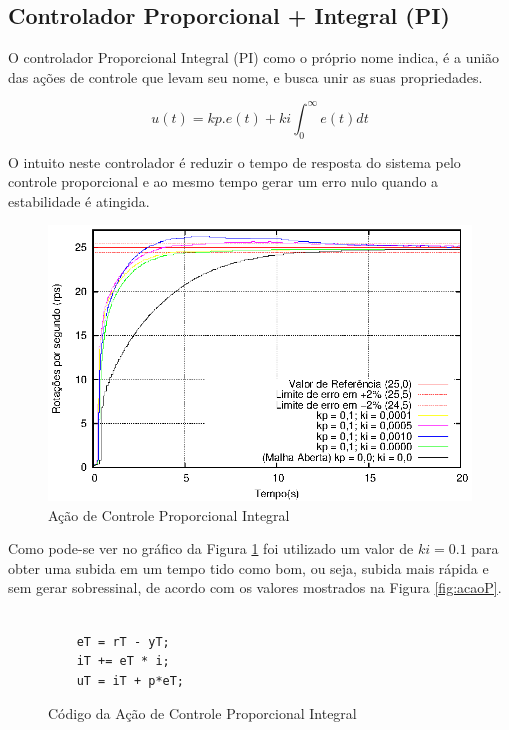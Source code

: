 \subsection{ Controlador Proporcional + Integral (PI) }

O controlador Proporcional Integral (PI) como o próprio nome indica, é a união das ações de controle que levam seu nome, e busca unir as suas propriedades.
 
\begin{equation}
u(t) = kp.e(t) + ki \int_{0}^{\infty} e(t) dt
\end{equation}

O intuito neste controlador é reduzir o tempo de resposta do sistema pelo controle proporcional e ao mesmo tempo gerar um erro nulo quando a estabilidade é atingida.

\begin{figure}[!htb]
\center\includegraphics[scale=1.2]{./imagens/acaoPI.eps}
\caption{Ação de Controle Proporcional Integral}
\label{fig:acaoPI}
\end{figure}

Como pode-se ver no gráfico da Figura \ref{fig:acaoPI} foi utilizado um valor de $ki = 0.1$ para obter uma subida em um tempo tido como bom, ou seja, subida mais rápida e sem gerar sobressinal, de acordo com os valores mostrados na Figura \ref{fig:acaoP}.

\begin{figure}[!htb]
\centering
\begin{minipage}{0.8\linewidth}
\lstset{firstnumber=13}
\begin{lstlisting}

    eT = rT - yT;
    iT += eT * i; 
    uT = iT + p*eT;
\end{lstlisting}
\end{minipage}
\caption{Código da Ação de Controle Proporcional Integral}
\label{fig:codigoControladorPI}
\end{figure}

